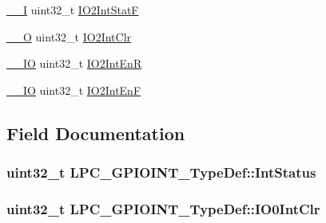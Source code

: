 \begin{DoxyCompactItemize}
\hyperlink{LPC17xx_8h_af63697ed9952cc71e1225efe205f6cd3}{\+\_\+\+\_\+I} uint32\+\_\+t \hyperlink{structLPC__GPIOINT__TypeDef_a47babfbe052441ddac928c91560e3606}{I\+O2\+Int\+StatF}
\item 
\hyperlink{LPC17xx_8h_a7e25d9380f9ef903923964322e71f2f6}{\+\_\+\+\_\+O} uint32\+\_\+t \hyperlink{structLPC__GPIOINT__TypeDef_a1ee47557eb72e360ac71633b72d510cb}{I\+O2\+Int\+Clr}
\item 
\hyperlink{LPC17xx_8h_aec43007d9998a0a0e01faede4133d6be}{\+\_\+\+\_\+\+IO} uint32\+\_\+t \hyperlink{structLPC__GPIOINT__TypeDef_a3a443b7e903e36f890aad5b392cfe759}{I\+O2\+Int\+EnR}
\item 
\hyperlink{LPC17xx_8h_aec43007d9998a0a0e01faede4133d6be}{\+\_\+\+\_\+\+IO} uint32\+\_\+t \hyperlink{structLPC__GPIOINT__TypeDef_a6ec2f354e0d7e401afc4d783f21f321d}{I\+O2\+Int\+EnF}
\end{DoxyCompactItemize}


\subsection{Field Documentation}
\subsubsection[{\texorpdfstring{Int\+Status}{IntStatus}}]{ uint32\+\_\+t L\+P\+C\+\_\+\+G\+P\+I\+O\+I\+N\+T\+\_\+\+Type\+Def\+::\+Int\+Status}\hypertarget{structLPC__GPIOINT__TypeDef_afa4872f0a2ecebbd18074d6100eff854}{}\label{structLPC__GPIOINT__TypeDef_afa4872f0a2ecebbd18074d6100eff854}
\subsubsection[{\texorpdfstring{I\+O0\+Int\+Clr}{IO0IntClr}}]{ uint32\+\_\+t L\+P\+C\+\_\+\+G\+P\+I\+O\+I\+N\+T\+\_\+\+Type\+Def\+::\+I\+O0\+Int\+Clr}\hypertarget{structLPC__GPIOINT__TypeDef_a8403a2d96791a9fe05a0a2bb15b9a5a3}{}\label{structLPC__GPIOINT__TypeDef_a8403a2d96791a9fe05a0a2bb15b9a5a3}
